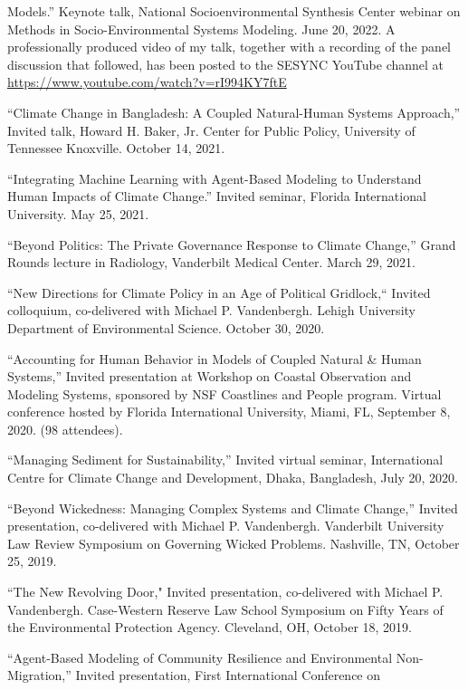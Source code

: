    Models.'' Keynote talk, National Socioenvironmental Synthesis Center
   webinar on Methods in Socio-Environmental Systems Modeling.
   June 20, 2022. A professionally produced video of my talk, together with a
   recording of the panel discussion that followed, has been posted to the
   SESYNC YouTube channel at \url{https://www.youtube.com/watch?v=rI994KY7ftE}
\item ``Climate Change in Bangladesh: A Coupled Natural-Human Systems
   Approach,'' Invited talk, Howard H. Baker, Jr. Center for Public Policy,
   University of Tennessee Knoxville. October 14, 2021.
\item ``Integrating Machine Learning with Agent-Based Modeling to Understand
  Human Impacts of Climate Change.'' Invited seminar, Florida International
  University. May 25, 2021.
\item ``Beyond Politics: The Private Governance Response to Climate
  Change,'' Grand Rounds lecture in Radiology, Vanderbilt Medical Center.
  March 29, 2021.
\item ``New Directions for Climate Policy in an Age of Political Gridlock,``
  Invited colloquium, co-delivered with Michael P. Vandenbergh. Lehigh
  University Department of Environmental Science. October 30, 2020.
\item ``Accounting for Human Behavior in Models of Coupled Natural \& Human
  Systems,'' Invited presentation at Workshop on Coastal Observation and
  Modeling Systems, sponsored by NSF Coastlines and People program. Virtual
  conference hosted by Florida International University, Miami, FL,
  September 8, 2020. (98 attendees).
\item ``Managing Sediment for Sustainability,'' Invited virtual seminar,
  International Centre for Climate Change and Development, Dhaka, Bangladesh,
  July 20, 2020.
\item ``Beyond Wickedness: Managing Complex Systems and Climate Change,''
  Invited presentation, co-delivered with Michael P. Vandenbergh. Vanderbilt
  University Law Review Symposium on Governing Wicked Problems. Nashville, TN,
  October 25, 2019.
\item ``The New Revolving Door," Invited presentation, co-delivered with
  Michael P. Vandenbergh. Case-Western Reserve Law School Symposium on Fifty
  Years of the Environmental Protection Agency. Cleveland, OH, October 18, 2019.
\item ``Agent-Based Modeling of Community Resilience and Environmental
 Non-Migration,'' Invited presentation, First International Conference on
